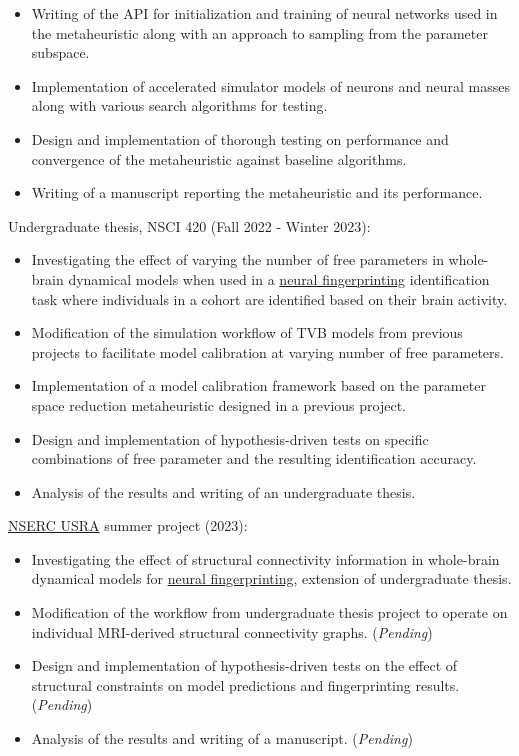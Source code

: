 \documentclass[margin, 10pt]{res} %
\begin{document}
\begin{resume}
\begin{itemize}
			\item Writing of the API for initialization and training of neural networks used in the metaheuristic along with an approach to sampling from the parameter subspace.
			\item Implementation of accelerated simulator models of neurons and neural masses along with various search algorithms for testing. 
			\item Design and implementation of thorough testing on performance and convergence of the metaheuristic against baseline algorithms.
			\item Writing of a manuscript reporting the metaheuristic and its performance.
		\end{itemize}
		\vspace{-0.10cm}
		Undergraduate thesis, NSCI 420 (Fall 2022 - Winter 2023):
		\vspace*{0.15cm}
		\begin{itemize} \itemsep -2pt %
			\item[\ding{227}] Investigating the effect of varying the number of free parameters in whole-brain dynamical models when used in a \href{https://www.nature.com/articles/s41467-021-25895-8}{neural fingerprinting} identification task where individuals in a cohort are identified based on their brain activity.
			\item Modification of the simulation workflow of TVB models from previous projects to facilitate model calibration at varying number of free parameters.
			\item Implementation of a model calibration framework based on the parameter space reduction metaheuristic designed in a previous project.
			\item Design and implementation of hypothesis-driven tests on specific combinations of free parameter and the resulting identification accuracy.
			\item Analysis of the results and writing of an undergraduate thesis.
		\end{itemize}
		\vspace{-0.10cm}
		\href{https://www.nserc-crsng.gc.ca/students-etudiants/ug-pc/usra-brpc_eng.asp}{NSERC USRA} summer project (2023):
		\vspace*{0.15cm}
		\begin{itemize} \itemsep -2pt %
			\item[\ding{227}] Investigating the effect of structural connectivity information in whole-brain dynamical models for \href{https://www.nature.com/articles/s41467-021-25895-8}{neural fingerprinting}, extension of undergraduate thesis.
			\item Modification of the workflow from undergraduate thesis project to operate on individual MRI-derived structural connectivity graphs. (\textit{Pending})
			\item Design and implementation of hypothesis-driven tests on the effect of structural constraints on model predictions and fingerprinting results. (\textit{Pending})
			\item Analysis of the results and writing of a manuscript. (\textit{Pending})
		\end{itemize}
		

\end{resume}
\end{document}
